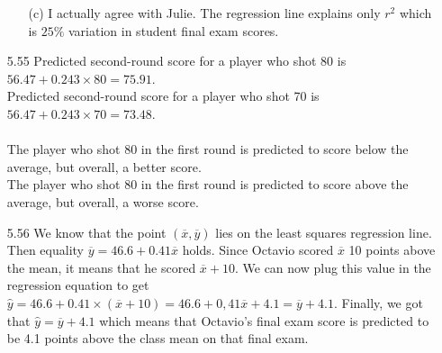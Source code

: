 \documentclass[11pt, a4paper]{article}
\begin{document}
\begin{itemize}
\begin{itemize}
\item[]

\item[(c)]
I actually agree with Julie. The regression line explains only
$r^2$ which is $25\%$ variation in student final exam scores.
\end{itemize}

\item[]
\item[]

\item[5.55]
Predicted second-round score for a player who shot 80 is $56.47 + 0.243 \times 80 = 75.91$.\\
Predicted second-round score for a player who shot 70 is $56.47 + 0.243 \times 70 = 73.48$.\\\\
The player who shot 80 in the first round is predicted to score below
the average, but overall, a better score.\\
The player who shot 80 in the first round is predicted to score above
the average, but overall, a worse score.

\item[]
\item[]

\item[5.56]
We know that the point $(\overline{x}, \overline{y})$ lies
on the least squares regression line. Then equality $\overline{y} = 46.6 + 0.41\overline{x}$ holds. Since Octavio scored $\overline{x}$ 10 points
above the mean, it means that he scored $\overline{x} + 10$. We can
now plug this value in the regression equation to get $\hat{y} = 46.6 + 0.41 \times (\overline{x} + 10) = 46.6 + 0,41\overline{x} + 4.1 = \overline{y} + 4.1$. Finally, we got that $\hat{y} = \overline{y} + 4.1$
which means that Octavio's final exam score is predicted to be 4.1 points
above the class mean on that final exam.
\end{itemize}
\end{document}
